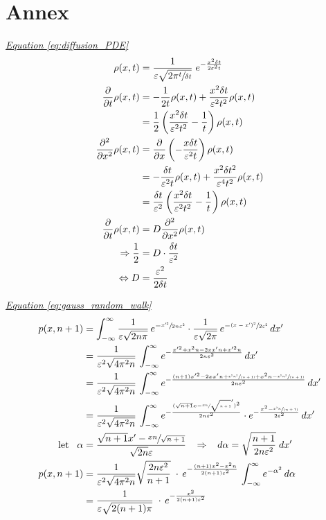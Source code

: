 \documentclass[a4paper, parskip=half]{scrartcl}
\newcommand{\myEqRef}[1]{\textit{\hyperref[eq:#1]{Equation \ref*{eq:#1}}}}
\begin{document}
\section{Annex}
\myEqRef{diffusion_PDE}
\begin{align}
\rho(x,t) &= \frac{1}{\varepsilon\sqrt{2\pi\sfrac{t}{\delta t}}}\; e^{-\frac{x^2 \delta t}{2 \varepsilon^2 t}} \\
\frac{\partial}{\partial t} \rho(x,t) &= - \frac{1}{2t} \rho(x,t) + \frac{x^2 \delta t}{\varepsilon^2t^2} \rho(x,t) \\
&= \frac{1}{2} \left(\frac{x^2 \delta t}{\varepsilon^2t^2} - \frac{1}{t} \right)\rho(x,t) \\
\frac{\partial^2}{\partial x^2} \rho(x,t) &= \frac{\partial}{\partial x} \left(-\frac{x\delta t}{\varepsilon^2t} \right) \rho(x,t) \\
&= -\frac{\delta t}{\varepsilon^2t} \rho(x,t) + \frac{x^2\delta t^2}{\varepsilon^4 t^2} \rho(x,t) \\
&= \frac{\delta t}{\varepsilon^2}\left(\frac{x^2 \delta t}{\varepsilon^2 t^2} - \frac{1}{t}\right) \rho(x,t) \\
\frac{\partial}{\partial t} \rho(x,t) &= D \frac{\partial^2}{\partial x^2 } \rho(x,t)\\
\Rightarrow \frac{1}{2} &= D \cdot \frac{\delta t}{\varepsilon^2}\\
\Leftrightarrow D &= \frac{\varepsilon^2}{2\delta t}
\end{align}

\myEqRef{gauss_random_walk}
\begin{align}
p(x,n+1) &= \int_{-\infty}^\infty \frac{1}{\varepsilon\sqrt{2n\pi}}\, e^{-\sfrac{x'^2}{2n\varepsilon^2}} \cdot \frac{1}{\varepsilon\sqrt{2\pi}}\, e^{-\sfrac{(x - x')^2}{2\varepsilon^2}} \, dx'\\
&= \frac{1}{\varepsilon^2\sqrt{4\pi^2n}} \, \int_{-\infty}^\infty e^{-\frac{x'^2 + x^2n - 2xx'n +x'^2n}{2n\varepsilon^2}}\, dx' \\
&= \frac{1}{\varepsilon^2\sqrt{4\pi^2n}} \, \int_{-\infty}^\infty e^{-\frac{(n+1)x'^2 - 2xx'n + \sfrac{x^2n^2}{(n+1)} + x^2n - \sfrac{x^2n^2}{(n+1)}}{2n\varepsilon^2}}\, dx' \\
&= \frac{1}{\varepsilon^2\sqrt{4\pi^2n}} \, \int_{-\infty}^\infty e^{-\frac{(\sqrt{n+1}x - \sfrac{xn}{\sqrt{n+1}}')^2}{2n\varepsilon^2}} \cdot e^{- \frac{x^2 - \sfrac{x^2n}{(n+1)}}{2\varepsilon^2}}\, dx' \\
\mathrm{let}\;\;\; \alpha &= \frac{\sqrt{n+1}x' - \sfrac{xn}{\sqrt{n+1}}}{\sqrt{2n}\varepsilon}
\;\;\; \Rightarrow \;\;\; d\alpha = \sqrt{\frac{n+1}{2n\varepsilon^2}}\; dx'\\
p(x,n+1) &= \frac{1}{\varepsilon^2\sqrt{4\pi^2n}} \sqrt{\frac{2n\varepsilon^2}{n+1}}\;\cdot\, e^{-\frac{(n+1)x^2 - x^2n}{2(n+1)\varepsilon^2}}\, \int_{-\infty}^\infty e^{-\alpha^2}\, d\alpha\\
&= \frac{1}{\varepsilon\sqrt{2(n+1)\pi}}\;\cdot\, e^{-\frac{x^2}{2(n+1)\varepsilon^2}}
\end{align}
\end{document}
